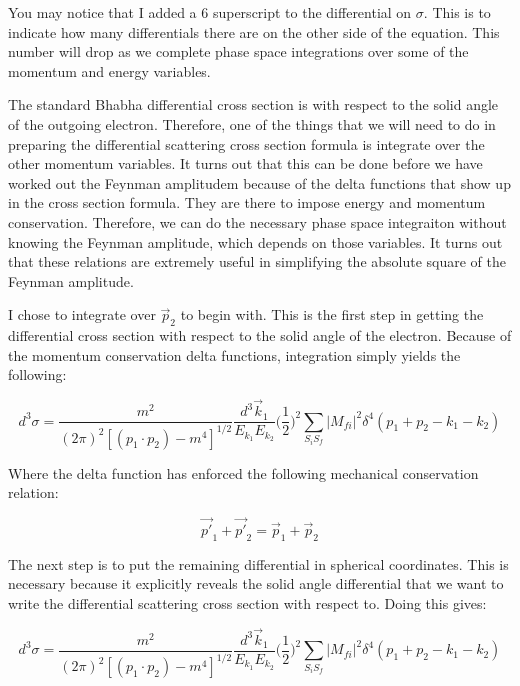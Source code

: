 \documentclass[a4]{article}
\begin{document}
    You may notice that I added a 6 superscript to the differential on $\sigma$. This is to indicate how many differentials there are on the other side of the equation. This number will drop as we 
    complete phase space integrations over some of the momentum and energy variables.

    The standard Bhabha differential cross section is with respect to the solid angle of the outgoing electron. Therefore, one of the things that we will need to do in preparing the differential 
    scattering cross section formula is integrate over the other momentum variables. It turns out that this can be done before we have worked out the Feynman amplitudem because of the delta functions that
    show up in the cross section formula. They are there to impose energy and momentum conservation. Therefore, we can do the necessary phase space integraiton without knowing the Feynman amplitude, which
    depends on those variables. It turns out that these relations are extremely useful in simplifying the absolute square of the Feynman amplitude.

    I chose to integrate over $\vec{p}_2$ to begin with. This is the first step in getting the differential cross section with respect to the solid angle of the electron. Because of the momentum conservation
    delta functions, integration simply yields the following:

    \begin{equation}
        d^3 \sigma = \frac{m^2}{(2 \pi)^2 [(p_1 \cdot p_2) - m^4]^{1/2}} \frac{d^3 \vec{k}_1}{E_{k_1} E_{k_2}} \bigg( \frac{1}{2} \bigg)^2 \sum_{S_i S_f} |M_{fi}|^2 \delta^4 (p_1 + p_2 - k_1 - k_2)
    \end{equation}

    Where the delta function has enforced the following mechanical conservation relation:

    \begin{equation}
        \vec{p'}_1 + \vec{p'}_2 = \vec{p}_1 + \vec{p}_2
    \end{equation}

    The next step is to put the remaining differential in spherical coordinates. This is necessary because it explicitly reveals the solid angle differential that we want to write the differential scattering
    cross section with respect to. Doing this gives:

    \begin{equation}
        d^3 \sigma = \frac{m^2}{(2 \pi)^2 [(p_1 \cdot p_2) - m^4]^{1/2}} \frac{d^3 \vec{k}_1}{E_{k_1} E_{k_2}} \bigg( \frac{1}{2} \bigg)^2 \sum_{S_i S_f} |M_{fi}|^2 \delta^4 (p_1 + p_2 - k_1 - k_2)
    \end{equation}
\end{document}
